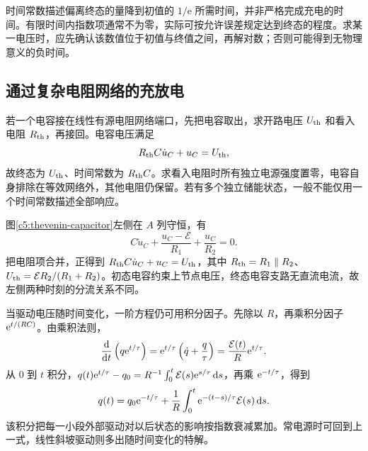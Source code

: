 时间常数描述偏离终态的量降到初值的 $1/\mathrm e$ 所需时间，并非严格完成充电的时间。有限时间内指数项通常不为零，实际可按允许误差规定达到终态的程度。求某一电压时，应先确认该数值位于初值与终值之间，再解对数；否则可能得到无物理意义的负时间。

\subsection{通过复杂电阻网络的充放电}

若一个电容接在线性有源电阻网络端口，先把电容取出，求开路电压 $U_{\rm th}$ 和看入电阻 $R_{\rm th}$，再接回。电容电压满足
\[
 R_{\rm th}C\dot u_C+u_C=U_{\rm th},
\]
故终态为 $U_{\rm th}$、时间常数为 $R_{\rm th}C$。求看入电阻时所有独立电源强度置零，电容自身排除在等效网络外，其他电阻仍保留。若有多个独立储能状态，一般不能仅用一个时间常数描述全部响应。

图\ref{c5:thevenin-capacitor}左侧在 $A$ 列守恒，有
\[
 C\dot u_C+\frac{u_C-\mathcal E}{R_1}+\frac{u_C}{R_2}=0.
\]
把电阻项合并，正得到 $R_{\rm th}C\dot u_C+u_C=U_{\rm th}$，其中 $R_{\rm th}=R_1\parallel R_2$、$U_{\rm th}=\mathcal E R_2/(R_1+R_2)$。初态电容约束上节点电压，终态电容支路无直流电流，故左侧两种时刻的分流关系不同。

当驱动电压随时间变化，一阶方程仍可用积分因子。先除以 $R$，再乘积分因子 $\mathrm e^{t/(RC)}$。由乘积法则，
\[
\frac{\mathop{}\!\mathrm d}{\mathop{}\!\mathrm d t}\left(q\mathrm e^{t/\tau}\right)
=\mathrm e^{t/\tau}\left(\dot q+\frac q\tau\right)
=\frac{\mathcal E(t)}R\mathrm e^{t/\tau}.
\]
从 $0$ 到 $t$ 积分，$q(t)\mathrm e^{t/\tau}-q_0
=R^{-1}\int_0^t\mathcal E(s)\mathrm e^{s/\tau}\mathop{}\!\mathrm d s$，再乘 $\mathrm e^{-t/\tau}$，得到
\[
 q(t)=q_0\mathrm e^{-t/\tau}+\frac1R\int_0^t
 \mathrm e^{-(t-s)/\tau}\mathcal E(s)\mathop{}\!\mathrm d s.
\]
该积分把每一小段外部驱动对以后状态的影响按指数衰减累加。常电源时可回到上一式，线性斜坡驱动则多出随时间变化的特解。

